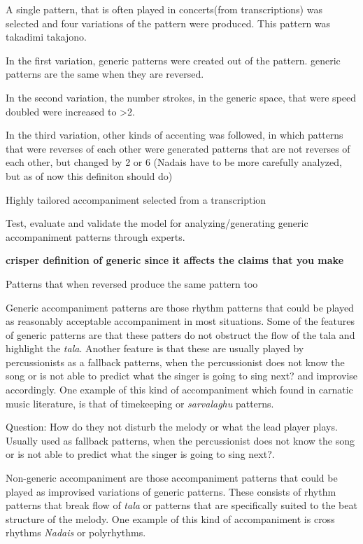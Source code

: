 A single pattern, that is often played in concerts(from transcriptions) was selected and four variations of the pattern were produced. This pattern was takadimi takajono. 

In the first variation, generic patterns were created out of the pattern. generic patterns are the same when they are reversed.

In the second variation, the number strokes, in the generic space, that were speed doubled were increased to >2.  

In the third variation, other kinds of accenting was followed, in which patterns that were reverses of each other were generated
patterns that are not reverses of each other, but changed by 2 or 6
(Nadais have to be more carefully analyzed, but as of now this definiton should do)

Highly tailored accompaniment selected from a transcription

Test, evaluate and validate the model for analyzing/generating generic accompaniment patterns through experts. 

\textbf{crisper definition of generic since it affects the claims that you make}

Patterns that when reversed produce the same pattern too

Generic accompaniment patterns are  those rhythm patterns that could be played as reasonably acceptable accompaniment in most situations. 
Some of the features of generic patterns are that these patters do not obstruct the flow of the tala and highlight the \emph{tala}. Another feature is that these are  usually played by percussionists as a fallback patterns, when the percussionist does not know the song or is not able to predict what the singer is going to sing next{?} and improvise accordingly. One example of this kind of accompaniment which found in carnatic music literature, is that of timekeeping or \emph{sarvalaghu} patterns.

Question: How do they not disturb the melody or what the lead player plays. Usually used as fallback patterns, when the percussionist does not know the song or is not able to predict what the singer is going to sing next{?}.

Non-generic accompaniment are those accompaniment patterns that could be played as improvised variations of generic patterns. These consists of rhythm patterns that break flow of \emph{tala} or patterns that are specifically suited to the beat structure of the melody. One example of this kind of accompaniment is cross rhythms \emph{Nadais} or polyrhythms.


